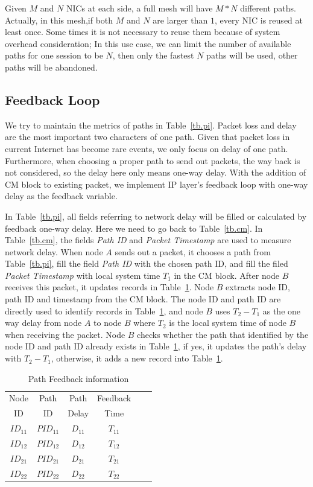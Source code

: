 Given $M$ and $N$ NICs at each side, a full mesh will have $M*N$ different paths. Actually, in this mesh,if both $M$ and $N$ are larger than $1$, every NIC is reused at least once. Some times it is not necessary to reuse them because of system overhead consideration; In this use case, we can limit the number of available paths for one session to be $N$, then only the fastest $N$ paths will be used, other paths will be abandoned. 

\subsection{Feedback Loop}

We try to maintain the metrics of paths in Table~\ref{tb.pi}. Packet loss and delay are the most important two characters of one path. Given that packet loss in current Internet has become rare events, we only focus on delay of one path. Furthermore, when choosing a proper path to send out packets, the way back is not considered, so the delay here only means one-way delay. With the addition of CM block to existing packet, we implement IP layer's feedback loop with one-way delay as the feedback variable. 


In Table~\ref{tb.pi}, all fields referring to network delay will be filled or calculated by feedback one-way delay. Here we need to go back to Table~\ref{tb.cm}. In Table~\ref{tb.cm}, the fields \emph{Path ID} and \emph{Packet Timestamp} are used to measure network delay. When node $A$ sends out a packet, it chooses a path from Table~\ref{tb.pi}, fill the field \emph{Path ID} with the chosen path ID, and fill the filed \emph{Packet Timestamp} with local system time $T_1$ in the CM block. After node $B$ receives this packet, it updates records in Table~\ref{tb.ps}. Node $B$ extracts node ID, path ID and timestamp from the CM block. The node ID and path ID are directly used to identify records in Table~\ref{tb.ps}, and node $B$ uses $T_2-T_1$ as the one way delay from node $A$ to node $B$ where $T_2$ is the local system time of node $B$ when receiving the packet. Node $B$ checks whether the path that identified by the node ID and path ID already exists in Table~\ref{tb.ps}, if yes, it updates the path's delay with $T_2-T_1$, otherwise, it adds a new record into Table~\ref{tb.ps}.

\begin{table}[htbp]
\caption{\label{tb.ps}Path Feedback information}
\centering
\begin{tabular}{|c|c|c|c|c|c|}
\hline
 Node   & Path    & Path      & Feedback           \\
  ID    &  ID     & Delay     & Time               \\
\hline
${ID}_{11}$&${PID}_{11}$&${D}_{11}$&${T}_{11}$   \\
\hline
${ID}_{12}$&${PID}_{12}$&${D}_{12}$&${T}_{12}$   \\
\hline
${ID}_{21}$&${PID}_{21}$&${D}_{21}$&${T}_{21}$   \\
\hline
${ID}_{22}$&${PID}_{22}$&${D}_{22}$&${T}_{22}$   \\
\hline
\end{tabular}
\end{table}

